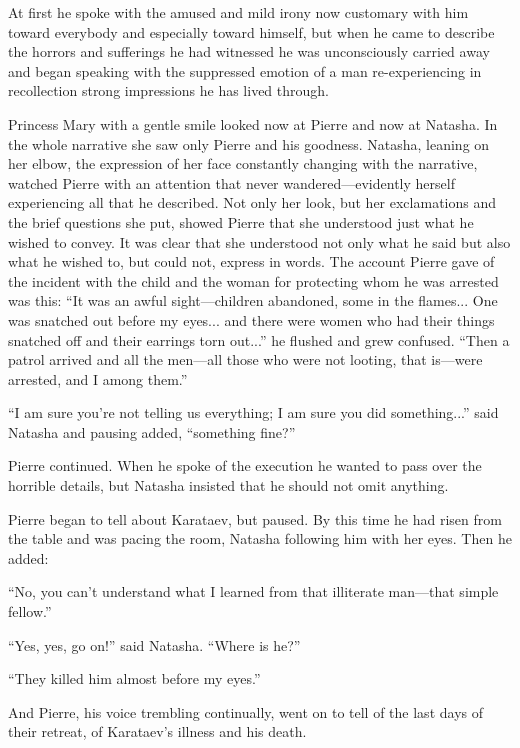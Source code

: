 At first he spoke with the amused and mild irony now customary
with him toward everybody and especially toward himself, but when
he came to describe the horrors and sufferings he had witnessed
he was unconsciously carried away and began speaking with the
suppressed emotion of a man re-experiencing in recollection
strong impressions he has lived through.

Princess Mary with a gentle smile looked now at Pierre and now at
Natasha. In the whole narrative she saw only Pierre and his
goodness.  Natasha, leaning on her elbow, the expression of her
face constantly changing with the narrative, watched Pierre with
an attention that never wandered---evidently herself experiencing
all that he described. Not only her look, but her exclamations
and the brief questions she put, showed Pierre that she
understood just what he wished to convey. It was clear that she
understood not only what he said but also what he wished to, but
could not, express in words. The account Pierre gave of the
incident with the child and the woman for protecting whom he was
arrested was this: ``It was an awful sight---children abandoned,
some in the flames...  One was snatched out before my eyes... and
there were women who had their things snatched off and their
earrings torn out...'' he flushed and grew confused. ``Then a
patrol arrived and all the men---all those who were not looting,
that is---were arrested, and I among them.''

``I am sure you're not telling us everything; I am sure you did
something...'' said Natasha and pausing added, ``something
fine?''

Pierre continued. When he spoke of the execution he wanted to
pass over the horrible details, but Natasha insisted that he
should not omit anything.

Pierre began to tell about Karataev, but paused. By this time he
had risen from the table and was pacing the room, Natasha
following him with her eyes. Then he added:

``No, you can't understand what I learned from that illiterate
man---that simple fellow.''

``Yes, yes, go on!'' said Natasha. ``Where is he?''

``They killed him almost before my eyes.''

And Pierre, his voice trembling continually, went on to tell of
the last days of their retreat, of Karataev's illness and his
death.

